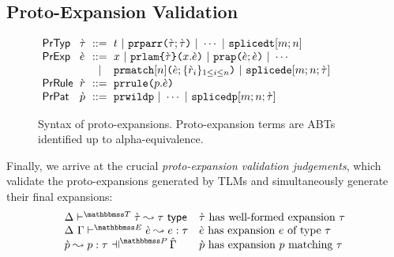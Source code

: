 \documentclass[acmsmall,review,anonymous]{acmart}\settopmatter{printfolios=true,printccs=false,printacmref=false}
\begin{document}
\subsection{Proto-Expansion Validation}\label{sec:ce-validation-U}\label{sec:ce-syntax-U}\label{sec:s-PEV}


\begin{figure}
\begin{minipage}{\textwidth}
\small
$\arraycolsep=3pt\begin{array}{llcl}
\mathsf{PrTyp} & \ctau & ::= & t ~\vert~
\aceparr{\ctau}{\ctau} ~\vert~ \cdots ~\vert~
\acesplicedt{m}{n}\\
\mathsf{PrExp} & \ce & ::= & x ~\vert~
\acelam{\ctau}{x}{\ce} ~\vert~
\aceap{\ce}{\ce} ~\vert~
\cdots \\
& & \vert & 
\acematchwith{n}{\ce}{\seqschemaX{\crv}} ~\vert~
\acesplicede{m}{n}{\ctau}\\
\mathsf{PrRule} & \crv & ::= & \acematchrule{p}{\ce}\\
\mathsf{PrPat} & \cpv & ::= & \acewildp ~\vert~
\cdots ~\vert~
\acesplicedp{m}{n}{\ctau} 
\end{array}$
\end{minipage}
\caption[Syntax of proto-types and proto-expressions]{Syntax of proto-expansions. Proto-expansion terms are ABTs identified up to alpha-equivalence.}
\label{fig:U-candidate-terms}
\end{figure}

Finally, we arrive at the crucial \emph{proto-expansion validation judgements}, which validate the proto-expansions generated by TLMs and simultaneously generate their final expansions:%
\[\begin{array}{ll}
\cvalidT{\Delta}{\tscenev}{\ctau}{\tau} & \text{$\ctau$ has well-formed expansion $\tau$}\\
\cvalidE{\Delta}{\Gamma}{\escenev}{\ce}{e}{\tau} & \text{$\ce$ has expansion $e$ of type $\tau$}\\
\cvalidP{\upctx}{\pscenev}{\cpv}{p}{\tau} & \text{$\cpv$ has expansion $p$ matching $\tau$}
\end{array}\]
\end{document}
